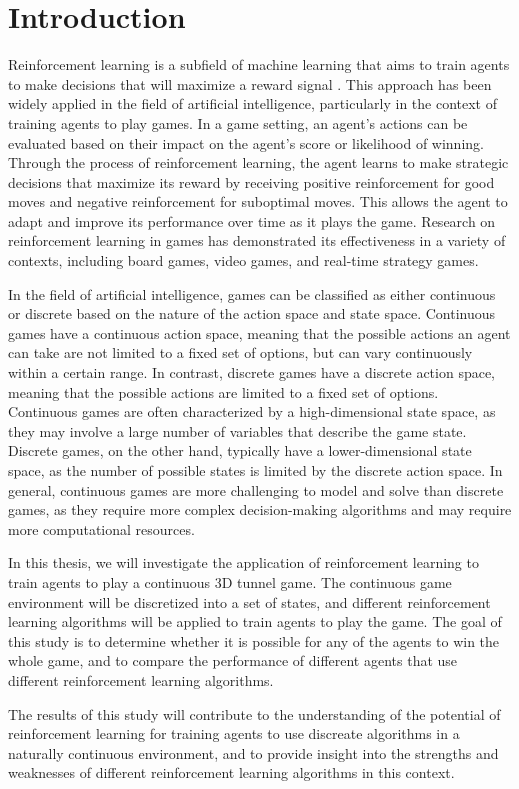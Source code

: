 \chapter*{Introduction}

Reinforcement learning is a subfield of machine learning that aims to train agents to make decisions that will maximize a reward signal \citep{RLSuttonBarto}. This approach has been widely applied in the field of artificial intelligence, particularly in the context of training agents to play games. In a game setting, an agent's actions can be evaluated based on their impact on the agent's score or likelihood of winning. Through the process of reinforcement learning, the agent learns to make strategic decisions that maximize its reward by receiving positive reinforcement for good moves and negative reinforcement for suboptimal moves. This allows the agent to adapt and improve its performance over time as it plays the game. Research on reinforcement learning in games has demonstrated its effectiveness in a variety of contexts, including board games, video games, and real-time strategy games.

In the field of artificial intelligence, games can be classified as either continuous or discrete based on the nature of the action space and state space. Continuous games have a continuous action space, meaning that the possible actions an agent can take are not limited to a fixed set of options, but can vary continuously within a certain range. In contrast, discrete games have a discrete action space, meaning that the possible actions are limited to a fixed set of options.
Continuous games are often characterized by a high-dimensional state space, as they may involve a large number of variables that describe the game state. Discrete games, on the other hand, typically have a lower-dimensional state space, as the number of possible states is limited by the discrete action space.
In general, continuous games are more challenging to model and solve than discrete games, as they require more complex decision-making algorithms and may require more computational resources.

In this thesis, we will investigate the application of reinforcement learning to train agents to play a continuous 3D tunnel game. The continuous game environment will be discretized into a set of states, and different reinforcement learning algorithms will be applied to train agents to play the game. The goal of this study is to determine whether it is possible for any of the agents to win the whole game, and to compare the performance of different agents that use different reinforcement learning algorithms.

The results of this study will contribute to the understanding of the potential of reinforcement learning for training agents to use discreate algorithms in a naturally continuous environment, and to provide insight into the strengths and weaknesses of different reinforcement learning algorithms in this context.\